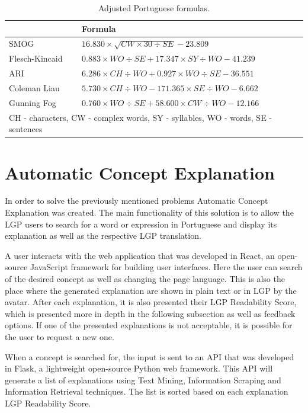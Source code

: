 \documentclass[runningheads]{llncs}
\begin{document}
\begin{table}
    \caption{Adjusted Portuguese formulas.}
    \label{table:ptformulas}
    \begin{tabular}{l|l}
        \hline
        {} & {\bfseries Formula} \\
        \hline
        SMOG & \(16.830 \times \sqrt{CW \times 30 \div SE} - 23.809\)  \\
        \hline
        Flesch-Kincaid & \(0.883 \times WO \div SE + 17.347 \times SY \div WO - 41.239\) \\
        \hline
        ARI & \(6.286 \times CH \div WO + 0.927 \times WO \div SE - 36.551\) \\
        \hline
        Coleman Liau & \(5.730 \times CH \div WO - 171.365 \times SE \div WO - 6.662\) \\
        \hline
        Gunning Fog & \(0.760 \times WO \div SE + 58.600 \times CW \div WO - 12.166\) \\
        \hline
        \multicolumn{2}{l}{CH - characters, CW - complex words, SY - syllables, WO - words, SE - sentences}
    \end{tabular}
\end{table}

\section{Automatic Concept Explanation}

In order to solve the previously mentioned problems Automatic Concept Explanation was created.
The main functionality of this solution is to allow the LGP users to search for a word or expression in Portuguese and display its explanation as well as the respective LGP translation.

A user interacts with the web application that was developed in React, an open-source JavaScript framework for building user interfaces.
Here the user can search of the desired concept as well as changing the page language.
This is also the place where the generated explanation are shown in plain text or in LGP by the avatar.
After each explanation, it is also presented their LGP Readability Score, which is presented more in depth in the following subsection as well as feedback options.
If one of the presented explanations is not acceptable, it is possible for the user to request a new one.

When a concept is searched for, the input is sent to an API that was developed in Flask, a lightweight open-source Python web framework.
This API will generate a list of explanations using Text Mining, Information Scraping and Information Retrieval techniques.
The list is sorted based on each explanation LGP Readability Score.
\end{document}
